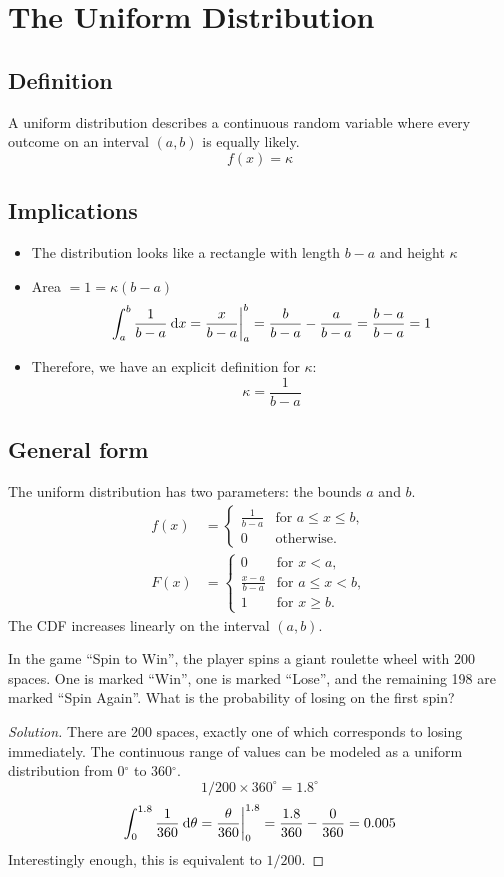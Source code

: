 \documentclass[11pt,leqno,letterpaper]{article}
\begin{document}
\section{The Uniform Distribution}
\subsection{Definition}
A uniform distribution describes a continuous random variable
where every outcome on an interval $(a,b)$ is equally likely.
\[
f(x) = \kappa
\]
\subsection{Implications}
\begin{itemize}
\item The distribution looks like a rectangle
with length $b-a$ and height $\kappa$
\item Area $= 1 = \kappa (b-a)$
\[
\int_a^b \frac{1}{b-a} \:\mathrm{d}x = \frac{x}{b-a}\bigg|_a^b
= \frac{b}{b-a} - \frac{a}{b-a} = \frac{b-a}{b-a} = 1
\]
\item Therefore, we have an explicit definition for $\kappa$:
\[
\kappa = \frac{1}{b-a}
\]
\end{itemize}
\subsection{General form}
The uniform distribution has two parameters: the bounds $a$ and $b$.
\begin{align*}
\tag{PDF}
f(x)&=
\begin{cases}
\frac{1}{b-a} & \text{for } a \leq x \leq b,\\
0 & \text{otherwise}.
\end{cases} \\
\tag{CDF}
F(x)&=
\begin{cases}
0 & \text{for } x < a,\\
\frac{x-a}{b-a} & \text{for } a \leq x < b,\\
1 & \text{for } x \geq b.
\end{cases}
\end{align*}
The CDF increases linearly on the interval $(a,b)$.

\begin{mdframed}
\begin{problem}
In the game ``Spin to Win'', the player spins a giant roulette wheel
with 200 spaces. One is marked ``Win'', one is marked ``Lose'',
and the remaining 198 are marked ``Spin Again''.
What is the probability of losing on the first spin?
\begin{proof}[Solution]
There are 200 spaces,
exactly one of which corresponds to losing immediately.
The continuous range of values can be modeled as
a uniform distribution from 0$^\circ$ to 360$^\circ$.
\[
1/200 \times 360^\circ = 1.8^\circ
\]
\[
\int_0^{1.8} \frac{1}{360} \:\mathrm{d}\theta
= \frac{\theta}{360} \bigg|_0^{1.8} 
= \frac{1.8}{360} - \frac{0}{360} = 0.005
\]
Interestingly enough, this is equivalent to $1/200$.
\end{proof}
\end{problem}
\end{mdframed}
\end{document}
